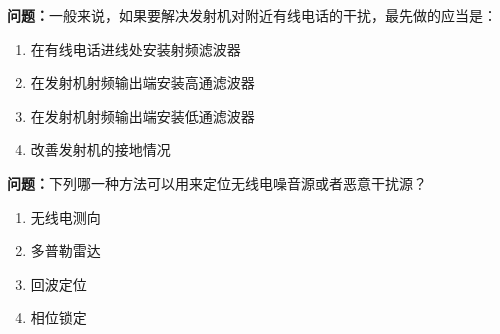 \bigskip


\noindent\textbf{问题：}一般来说，如果要解决发射机对附近有线电话的干扰，最先做的应当是：
\begin{enumerate}[label=\Alph*), leftmargin=3em]
	\item 在有线电话进线处安装射频滤波器
	\item 在发射机射频输出端安装高通滤波器
	\item 在发射机射频输出端安装低通滤波器
	\item 改善发射机的接地情况
\end{enumerate}

\bigskip


\noindent\textbf{问题：}下列哪一种方法可以用来定位无线电噪音源或者恶意干扰源？
\begin{enumerate}[label=\Alph*), leftmargin=3em]
	\item 无线电测向
	\item 多普勒雷达
	\item 回波定位
	\item 相位锁定
\end{enumerate}



